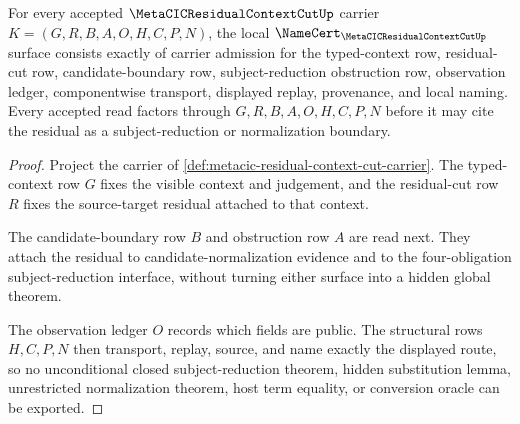 \begin{theorem}
\label{thm:metacic-residual-context-cut-namecert-obligations}
For every accepted $\MetaCICResidualContextCutUp$ carrier $K=(G,R,B,A,O,H,C,P,N)$, the local $\NameCert_{\MetaCICResidualContextCutUp}$ surface consists exactly of carrier admission for the typed-context row, residual-cut row, candidate-boundary row, subject-reduction obstruction row, observation ledger, componentwise transport, displayed replay, provenance, and local naming. Every accepted read factors through $G,R,B,A,O,H,C,P,N$ before it may cite the residual as a subject-reduction or normalization boundary.
\end{theorem}
\begin{proof}
Project the carrier of \autoref{def:metacic-residual-context-cut-carrier}. The typed-context row $G$ fixes the visible context and judgement, and the residual-cut row $R$ fixes the source-target residual attached to that context.

The candidate-boundary row $B$ and obstruction row $A$ are read next. They attach the residual to candidate-normalization evidence and to the four-obligation subject-reduction interface, without turning either surface into a hidden global theorem.

The observation ledger $O$ records which fields are public. The structural rows $H,C,P,N$ then transport, replay, source, and name exactly the displayed route, so no unconditional closed subject-reduction theorem, hidden substitution lemma, unrestricted normalization theorem, host term equality, or conversion oracle can be exported.
\end{proof}

